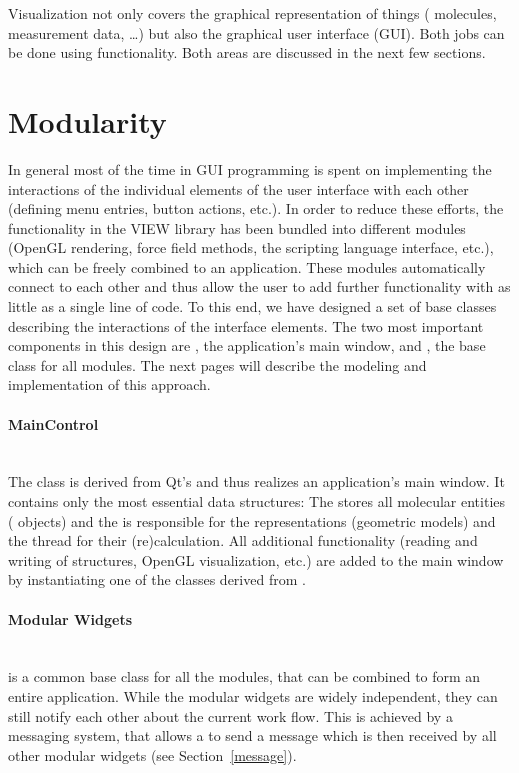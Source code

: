 \noindent
Visualization not only covers the graphical representation of things (\eg
molecules, measurement data, \dots) but also the graphical user interface
(GUI). Both jobs can be done using  functionality. Both areas are
discussed in the next few sections.


\section{Modularity}

In general most of the time in GUI programming is spent on implementing the 
interactions of the individual elements of the user interface with each other 
(\eg defining menu entries, button actions, etc.). In order to reduce these 
efforts, the functionality in the VIEW library has been bundled into different
modules (\eg OpenGL rendering, force field methods, the scripting language 
interface, etc.), which can be freely combined to an application. These modules
automatically connect to each other and thus allow the user to add further 
functionality with as little as a single line of code. To this end, we have 
designed a set of  base classes describing the interactions of the interface 
elements. The two most important components in this design are 
, the application's main window, and 
, the base class for all modules.
The next pages will describe the modeling and implementation of this approach.
\label{modularity}

\paragraph{MainControl} 
\hspace*{\fill}\\
The class  is derived from Qt's  and 
thus realizes an application's main window. It contains only the most essential
data structures: The  stores all molecular entities
( objects) and the  is responsible 
for the representations (\ie geometric models) and the thread for their
(re)calculation. All additional functionality (\eg reading and writing of 
structures, OpenGL visualization, etc.) are added to the main window by 
instantiating one of the classes derived from . 

\paragraph{Modular Widgets}
\hspace*{\fill}\\
 is a common base class for all the modules, that can be
combined to form an entire application. While the modular widgets are widely 
independent, they can still notify each other about the current work flow. 
This is achieved by a messaging system, that allows a 
to send a message which is then received by all other modular widgets (see 
Section~\ref{message}).

